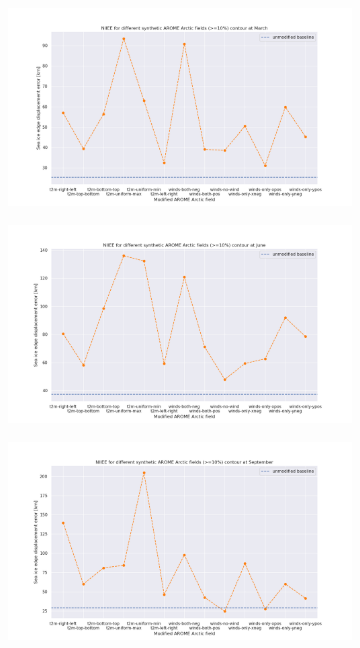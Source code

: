 \documentclass[../main/thesis.tex]{subfiles}
\begin{document}
\begin{figure}
    \centering
    \begin{subfigure}{.49\textwidth}
        \includegraphics[width=\textwidth]{NIIEE_03.png}
    \end{subfigure}
    \begin{subfigure}{.49\textwidth}
        \includegraphics[width=\textwidth]{NIIEE_06.png}
    \end{subfigure}
    \begin{subfigure}{.49\textwidth}
        \includegraphics[width=\textwidth]{NIIEE_09.png}

\end{subfigure}
\end{figure}
\end{document}
